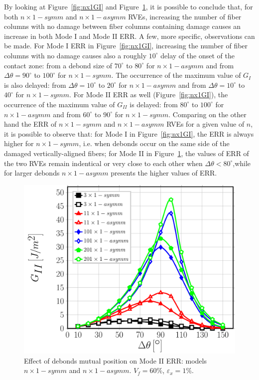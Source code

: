 \documentclass[smallextended]{svjour3}       %
\begin{document}
By looking at Figure~\ref{fig:nx1GI} and Figure~\ref{fig:nx1GII}, it is possible to conclude that, for both $n\times 1-symm$ and $n\times 1-asymm$ RVEs, increasing the number of fiber columns with no damage between fiber columns containing damage causes an increase in both Mode I and Mode II ERR. A few, more specific, observations can be made. For Mode I ERR in Figure~\ref{fig:nx1GI}, increasing the number of fiber columns with no damage causes also a roughly $10^{\circ}$ delay of the onset of the contact zone: from a debond size of $70^\circ$ to $80^\circ$ for $n\times 1-asymm$ and from $\Delta\theta=90^\circ$ to $100^\circ$ for $n\times 1-symm$. The occurrence of the maximum value of $G_{I}$ is also delayed: from $\Delta\theta=10^\circ$ to $20^\circ$ for $n\times 1-asymm$ and from $\Delta\theta=10^\circ$ to $40^\circ$ for $n\times 1-symm$. For Mode II ERR as well (Figure~\ref{fig:nx1GI}), the occurrence of the maximum value of $G_{II}$  is delayed: from $80^\circ$ to $100^\circ$ for $n\times 1-asymm$ and from $60^\circ$ to $90^\circ$ for $n\times 1-symm$. Comparing on the other hand the ERR of $n\times 1-symm$ and $n\times 1-asymm$ RVEs for a given value of $n$, it is possible to observe that: for Mode I in Figure~\ref{fig:nx1GI}, the ERR is always higher for $n\times 1-symm$, i.e. when debonds occur on the same side of the damaged vertically-aligned fibers; for Mode II in Figure~\ref{fig:nx1GII}, the values of ERR of the two RVEs remain indentical or very close to each other when $\Delta\theta<80^{\circ}$,while for larger debonds $n\times 1-asymm$ presents the higher values of ERR.

\begin{figure}[!h]
\centering
\includegraphics[width=\textwidth]{nx1-coupling-vf60-GII.pdf}
\caption{Effect of debonds mutual position on Mode II ERR: models $n\times 1-symm$ and $n\times 1-asymm$. $V_{f}=60\%$, $\varepsilon_{x}=1\%$.}\label{fig:nx1GII}
\end{figure}
\end{document}
